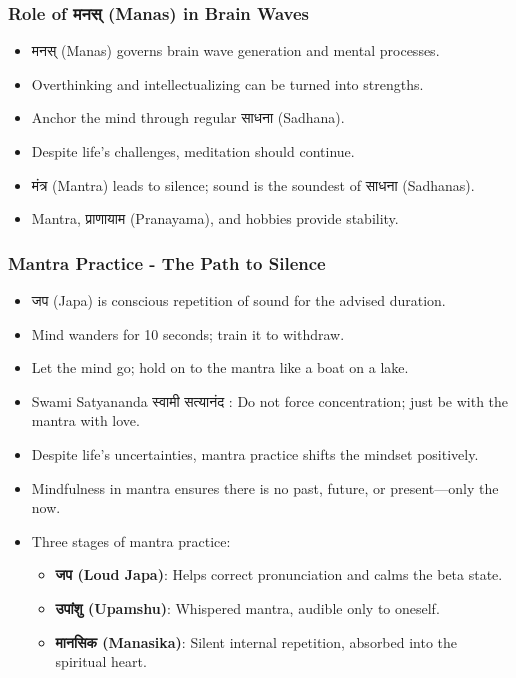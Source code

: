 \begin{frame}[fragile]\frametitle{Role of मनस् (Manas) in Brain Waves}
      \begin{itemize}
          \item मनस् (Manas) governs brain wave generation and mental processes.
          \item Overthinking and intellectualizing can be turned into strengths.
          \item Anchor the mind through regular साधना (Sadhana).
          \item Despite life’s challenges, meditation should continue.
          \item मंत्र (Mantra) leads to silence; sound is the soundest of साधना (Sadhanas).
          \item Mantra, प्राणायाम (Pranayama), and hobbies provide stability.
      \end{itemize}
\end{frame}

\begin{frame}[fragile]\frametitle{Mantra Practice - The Path to Silence}
      \begin{itemize}
          \item जप (Japa) is conscious repetition of sound for the advised duration.
          \item Mind wanders for 10 seconds; train it to withdraw.
          \item Let the mind go; hold on to the mantra like a boat on a lake.
          \item Swami Satyananda स्वामी सत्यानंद : Do not force concentration; just be with the mantra with love.
          \item Despite life’s uncertainties, mantra practice shifts the mindset positively.
          \item Mindfulness in mantra ensures there is no past, future, or present—only the now.
          \item Three stages of mantra practice:
            \begin{itemize}
                \item \textbf{ जप (Loud Japa)}: Helps correct pronunciation and calms the beta state.
                \item \textbf{उपांशु (Upamshu)}: Whispered mantra, audible only to oneself.
                \item \textbf{मानसिक (Manasika)}: Silent internal repetition, absorbed into the spiritual heart.
            \end{itemize}
      \end{itemize}
\end{frame}


